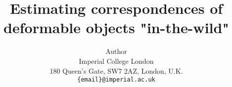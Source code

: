 \title{Estimating correspondences of deformable objects "in-the-wild"}

\author{Author\\
Imperial College London\\
180 Queen’s Gate, SW7 2AZ, London, U.K.\\
{\tt\small \{email\}@imperial.ac.uk}}

